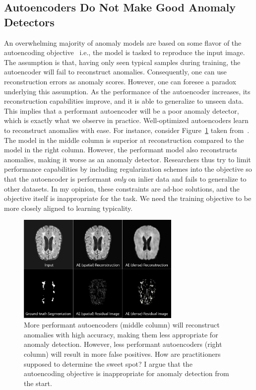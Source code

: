\subsection*{Autoencoders Do Not Make Good Anomaly Detectors}
An overwhelming majority of anomaly models are based on some flavor of the autoencoding objective~\cite{baur_deep_2019,baur2021,tschuchnig_anomaly_2022,kascenas2023} i.e., the model is tasked to reproduce the input image. The assumption is that, having only seen typical samples during training, the autoencoder will fail to reconstruct anomalies. Consequently, one can use reconstruction errors as anomaly scores. However, one can foresee a paradox underlying this assumption. As the performance of the autoencoder increases, its reconstruction capabilities improve, and it is able to generalize to unseen data. This implies that a performant autoencoder will be a poor anomaly detector, which is exactly what we observe in practice. Well-optimized autoencoders learn to reconstruct anomalies with ease. For instance, consider Figure~\ref{fig:ae_failure} taken from~\cite{baur_deep_2019}. The model in the middle column is superior at reconstruction compared to the model in the right column. However, the performant model also reconstructs anomalies, making it worse as an anomaly detector.
Researchers thus try to limit performance capabilities by including regularization schemes into the objective so that the autoencoder is performant \textit{only} on inlier data and fails to generalize to other datasets. In my opinion, these constraints are ad-hoc solutions, and the objective itself is inappropriate for the task.  We need the training objective to be more closely aligned to learning typicality. 

\begin{figure}[tbhp]
\centering
\includegraphics[width=0.7\textwidth]{figures/dense_vs_spatial.png}
\caption{More performant autoencoders (middle column) will reconstruct anomalies with high accuracy, making them less appropriate for anomaly detection. However, less performant autoencoders (right column) will result in more false positives. How are practitioners supposed to determine the sweet spot? I argue that the autoencoding objective is inappropriate for anomaly detection from the start.}
\label{fig:ae_failure}
\end{figure}%


